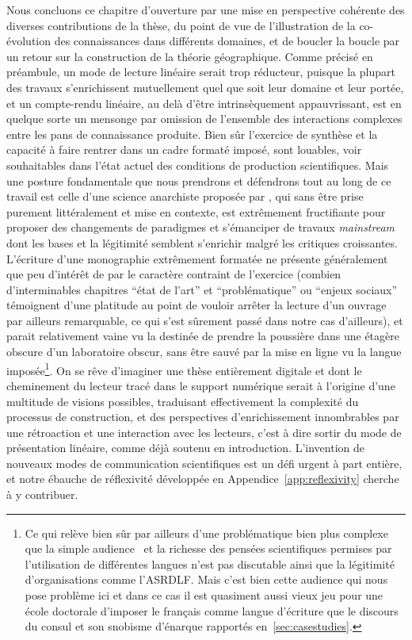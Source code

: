 Nous concluons ce chapitre d'ouverture par une mise en perspective cohérente des diverses contributions de la thèse, du point de vue de l'illustration de la co-évolution des connaissances dans différents domaines, et de boucler la boucle par un retour sur la construction de la théorie géographique. Comme précisé en préambule, un mode de lecture linéaire serait trop réducteur, puisque la plupart des travaux s'enrichissent mutuellement quel que soit leur domaine et leur portée, et un compte-rendu linéaire, au delà d'être intrinsèquement appauvrissant, est en quelque sorte un mensonge par omission de l'ensemble des interactions complexes entre les pans de connaissance produite. Bien sûr l'exercice de synthèse et la capacité à faire rentrer dans un cadre formaté imposé, sont louables, voir souhaitables dans l'état actuel des conditions de production scientifiques. Mais une posture fondamentale que nous prendrons et défendrons tout au long de ce travail est celle d'une science anarchiste proposée par , qui sans être prise purement littéralement et mise en contexte, est extrêmement fructifiante pour proposer des changements de paradigmes et s'émanciper de travaux \emph{mainstream} dont les bases et la légitimité semblent s'enrichir malgré les critiques croissantes. L'écriture d'une monographie extrêmement formatée ne présente généralement que peu d'intérêt de par le caractère contraint de l'exercice (combien d'interminables chapitres ``état de l'art'' et ``problématique'' ou ``enjeux sociaux'' témoignent d'une platitude au point de vouloir arrêter la lecture d'un ouvrage par ailleurs remarquable, ce qui s'est sûrement passé dans notre cas d'ailleurs), et parait relativement vaine vu la destinée de prendre la poussière dans une étagère obscure d'un laboratoire obscur, sans être sauvé par la mise en ligne vu la langue imposée\footnote{Ce qui relève bien sûr par ailleurs d'une problématique bien plus complexe que la simple audience~\cite{tardy2004role} et la richesse des pensées scientifiques permises par l'utilisation de différentes langues n'est pas discutable ainsi que la légitimité d'organisations comme l'ASRDLF. Mais c'est bien cette audience qui nous pose problème ici et dans ce cas il est quasiment aussi vieux jeu pour une école doctorale d'imposer le français comme langue d'écriture que le discours du consul et son snobisme d'énarque rapportés en~\ref{sec:casestudies}.}. On se rêve d'imaginer une thèse entièrement digitale et dont le cheminement du lecteur tracé dans le support numérique serait à l'origine d'une multitude de visions possibles, traduisant effectivement la complexité du processus de construction, et des perspectives d'enrichissement innombrables par une rétroaction et une interaction avec les lecteurs, c'est à dire sortir du mode de présentation linéaire, comme déjà soutenu en introduction. L'invention de nouveaux modes de communication scientifiques est un défi urgent à part entière, et notre ébauche de réflexivité développée en Appendice~\ref{app:reflexivity} cherche à y contribuer.



